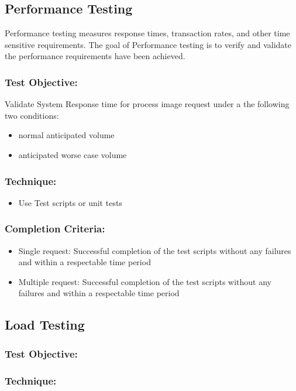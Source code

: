 \documentclass[a4paper,12pt]{report}
\begin{document}
		\subsection {Performance Testing}
			Performance testing measures response times, transaction rates, and other time sensitive requirements. 
			The goal of Performance testing is to verify and validate the performance requirements have been achieved. 
			\subsubsection {Test Objective:}
					Validate System Response time for process image request under a the following two conditions:
					\begin {itemize}
						\item normal anticipated volume
						\item anticipated worse case volume
					\end {itemize}
			\subsubsection {Technique:}
				\begin {itemize}
					\item Use Test scripts or unit tests 
				\end {itemize}
			\subsubsection {Completion Criteria:}
				\begin {itemize}
					\item Single request: Successful completion of the test scripts without any failures and within a respectable time period
					\item Multiple request: Successful completion of the test scripts without any failures and within a respectable time period
				\end {itemize}

\iffalse				
		\subsection {Load Testing}
			\subsubsection {Test Objective:}
			\subsubsection {Technique:}
\end{document}
